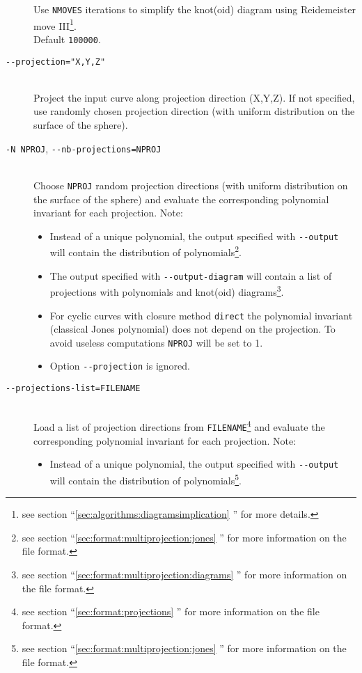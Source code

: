 \begin{description}
  Use \lstinline{NMOVES} iterations to simplify the knot(oid) diagram using Reidemeister move III\footnote{see section  ``\ref{sec:algorithms:diagramsimplication} '' for more details.}.\\
  Default \lstinline{100000}.
\item[\lstinline{--projection="X,Y,Z"}]\hfill\\ Project the input curve along projection direction (X,Y,Z). If not specified, use randomly chosen projection direction (with uniform distribution on the surface of the sphere).
\item[\lstinline{-N NPROJ}, \lstinline{--nb-projections=NPROJ}]\hfill\\
  Choose \lstinline{NPROJ} random projection directions (with uniform distribution on the surface of the sphere) and evaluate the corresponding polynomial invariant for each projection. Note:
  \begin{itemize}
  \item Instead of a unique polynomial, the output specified with \lstinline{--output} will contain the distribution of polynomials\footnote{see section ``\ref{sec:format:multiprojection:jones} '' for more information on the file format.}. 
    \item The output specified with \lstinline{--output-diagram} will contain a list of projections with polynomials and knot(oid) diagrams\footnote{see section ``\ref{sec:format:multiprojection:diagrams} '' for more information on the file format.}.
    \item For cyclic curves with closure method \lstinline{direct} the polynomial invariant (classical Jones polynomial) does not depend on the projection. To avoid useless computations \lstinline{NPROJ} will be set to 1.
    \item Option \lstinline{--projection} is ignored.                                  
  \end{itemize}
\item[\lstinline{--projections-list=FILENAME}]\hfill\\
  Load a list of projection directions from \lstinline{FILENAME}\footnote{see section ``\ref{sec:format:projections} '' for more information on the file format.} and evaluate the corresponding polynomial invariant for each projection. Note:
  \begin{itemize}
  \item Instead of a unique polynomial, the output specified with \lstinline{--output} will contain the distribution of polynomials\footnote{see section ``\ref{sec:format:multiprojection:jones} '' for more information on the file format.}. 

\end{itemize}
\end{description}
